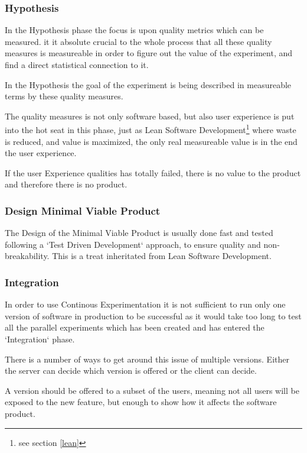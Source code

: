 \documentclass{sig-alternate}
\begin{document}
\subsubsection{Hypothesis}
\label{cx:hypothesis}
In the Hypothesis phase the focus is upon quality metrics which can be measured.
it it absolute crucial to the whole process that all these quality measures is measureable in order to figure 
out the value of the experiment, and find a direct statistical connection to it. 

In the Hypothesis the goal of the experiment is being described in measureable terms 
by these quality measures. 

The quality measures is not only software based, but also user experience is put into the hot seat in this 
phase, just as Lean Software Development\footnote{\label{see-lean}see section \ref{lean}} where waste 
is reduced, and value is maximized, the only real measureable value is in the end the user experience. 

If the user Experience qualities has totally failed, there is no value to the product and therefore there is 
no product.

\subsubsection{Design Minimal Viable Product}
\label{cx:design}
The Design of the Minimal Viable Product is usually done fast and tested following a `Test Driven Development`
approach, to ensure quality and non-breakability. 
This is a treat inheritated from Lean Software Development\footnotemark[\ref{see-lean}].

\subsubsection{Integration}
\label{cx:integration}
In order to use Continous Experimentation it is not sufficient to run only one version of software in 
production to be successful as it would take too long to test all the parallel experiments which has been
created and has entered the `Integration` phase. 

There is a number of ways to get around this issue of multiple versions. 
Either the server can decide which version is offered or the client can decide.

A version should be offered to a subset of the users, meaning not all users will be exposed to the 
new feature, but enough to show how it affects the software product.
\end{document}
